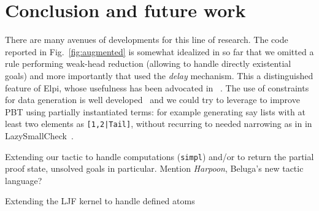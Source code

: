 \section{Conclusion and future work}




There are many avenues of developments for this line of research.
The code reported in Fig.~\ref{fig:augmented} is somewhat idealized in
so far that we omitted a rule performing weak-head reduction (allowing
to handle directly existential goals) and more importantly that used
the \emph{delay} mechanism. This a distinguished feature of Elpi, whose
usefulness has been advocated in ~\cite{DunchevCT16,coen19mscs}.  The
use of constraints for data generation is well
developed~\cite{FioravantiPS15} and we could try to leverage to
improve PBT using partially instantiated terms: for example generating
say lists with at least two elements as \texttt{[1,2|Tail]}, without
recurring to needed narrowing as in in
LazySmallCheck~\cite{smallcheck}.



Extending our tactic to handle computations (\texttt{simpl}) and/or to
return the partial proof state, unsolved goals in particular. Mention
\emph{Harpoon}, Beluga's new tactic language?

Extending the LJF kernel to handle defined atoms


